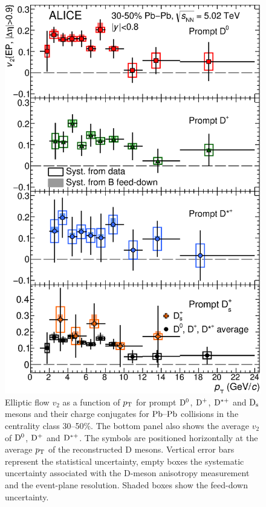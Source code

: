 \begin{figure}[!t]
\begin{center}
\includegraphics[width=.65\textwidth]{FigCap5/4mesons4pads.eps}
\caption{Elliptic flow $v_2$ as a function of $p_{\rm T}$ for prompt ${\rm D^0}$, ${\rm D^+}$, 
${\rm D^{*+}}$ and ${\rm D_s}$ mesons and their charge conjugates for $\mbox{Pb--Pb}$ collisions in the centrality class 30--50\%.
The bottom panel also shows the average
$v_2$ of ${\rm D^0}$, ${\rm D^+}$ and ${\rm D^{*+}}$. The symbols are positioned
horizontally at the average $p_{\rm T}$ of the reconstructed D mesons. %
Vertical error bars represent the statistical uncertainty, empty boxes the systematic 
uncertainty associated with the D-meson anisotropy measurement and the event-plane 
resolution. Shaded boxes show the feed-down uncertainty.}
\label{fig:v2_4mesons} 
\end{center}
\end{figure}

